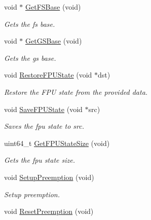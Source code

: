 \begin{DoxyCompactItemize}
void $\ast$ \hyperlink{group__threading_gafa6ab94b66d9d502f82eee51ecd34461}{Get\+F\+S\+Base} (void)
\begin{DoxyCompactList}\small\item\em Gets the fs base. \end{DoxyCompactList}\item 
void $\ast$ \hyperlink{group__threading_ga294a8015b35b546fb48ba727b705229c}{Get\+G\+S\+Base} (void)
\begin{DoxyCompactList}\small\item\em Gets the gs base. \end{DoxyCompactList}\item 
void \hyperlink{group__threading_ga5cf0bfd67b6889da19a7af46cd4d7c82}{Restore\+F\+P\+U\+State} (void $\ast$dst)
\begin{DoxyCompactList}\small\item\em Restore the F\+PU state from the provided data. \end{DoxyCompactList}\item 
void \hyperlink{group__threading_ga32dfcf939c45f78ef79e463657287192}{Save\+F\+P\+U\+State} (void $\ast$src)
\begin{DoxyCompactList}\small\item\em Saves the fpu state to src. \end{DoxyCompactList}\item 
uint64\+\_\+t \hyperlink{group__threading_ga9b4119f5e4968a2995f3e881b124a0d0}{Get\+F\+P\+U\+State\+Size} (void)
\begin{DoxyCompactList}\small\item\em Gets the fpu state size. \end{DoxyCompactList}\item 
void \hyperlink{group__threading_gabd8e5954c53364ddf5b7300bb0fc6ef4}{Setup\+Preemption} (void)\hypertarget{group__threading_gabd8e5954c53364ddf5b7300bb0fc6ef4}{}\label{group__threading_gabd8e5954c53364ddf5b7300bb0fc6ef4}

\begin{DoxyCompactList}\small\item\em Setup preemption. \end{DoxyCompactList}\item 
void \hyperlink{group__threading_gab52aed09194cc102f20c88258e997b87}{Reset\+Preemption} (void)\hypertarget{group__threading_gab52aed09194cc102f20c88258e997b87}{}\label{group__threading_gab52aed09194cc102f20c88258e997b87}


\end{DoxyCompactItemize}
